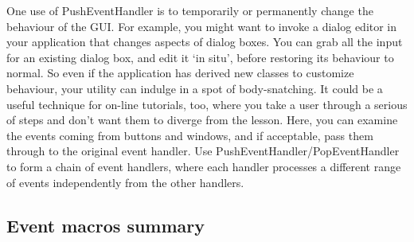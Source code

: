 One use of PushEventHandler is to temporarily or permanently change the
behaviour of the GUI. For example, you might want to invoke a dialog editor
in your application that changes aspects of dialog boxes. You can
grab all the input for an existing dialog box, and edit it `in situ',
before restoring its behaviour to normal. So even if the application
has derived new classes to customize behaviour, your utility can indulge
in a spot of body-snatching. It could be a useful technique for on-line
tutorials, too, where you take a user through a serious of steps and
don't want them to diverge from the lesson. Here, you can examine the events
coming from buttons and windows, and if acceptable, pass them through to
the original event handler. Use PushEventHandler/PopEventHandler
to form a chain of event handlers, where each handler processes a different
range of events independently from the other handlers.

\subsection{Event macros summary}\label{eventmacros}


\twocolwidtha{8cm}%
\begin{twocollist}\itemsep=0pt
\end{twocollist}


\twocolwidtha{8cm}%
\begin{twocollist}\itemsep=0pt
\end{twocollist}

